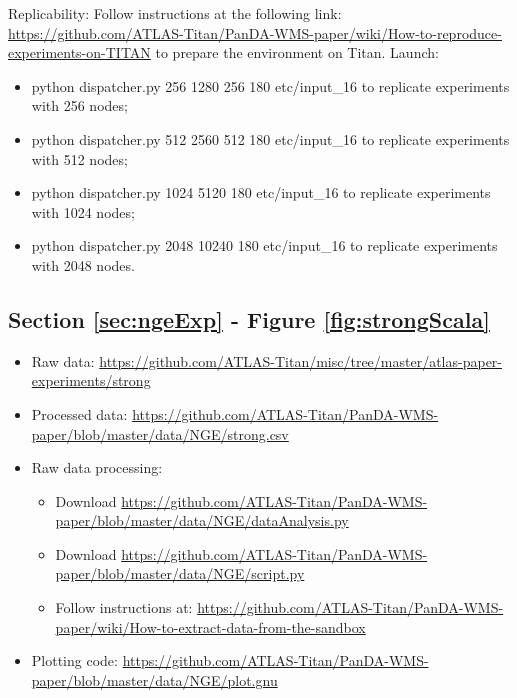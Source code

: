 Replicability: Follow instructions at the following link: \url{https://github.com/ATLAS-Titan/PanDA-WMS-paper/wiki/How-to-reproduce-experiments-on-TITAN} to prepare the environment on Titan.
Launch:
\begin{itemize}
\item python dispatcher.py 256 1280 256 180 etc/input\_16 to replicate experiments with 256 nodes;
\item python dispatcher.py 512 2560 512 180 etc/input\_16 to replicate experiments with 512 nodes;
\item python dispatcher.py 1024 5120 180 etc/input\_16 to replicate experiments with 1024 nodes;
\item python dispatcher.py 2048 10240 180 etc/input\_16 to replicate experiments with 2048 nodes.
\end{itemize}


\subsection{Section \ref{sec:ngeExp} - Figure \ref{fig:strongScala}}
\label{apndx:fig16}

\label{apndx:fig10}
\begin{itemize}
    \item Raw data: \url{https://github.com/ATLAS-Titan/misc/tree/master/atlas-paper-experiments/strong}
     \item Processed data: \url{ https://github.com/ATLAS-Titan/PanDA-WMS-paper/blob/master/data/NGE/strong.csv} 
    \item Raw data processing: 
    	\begin{itemize}
    		\item Download \url{https://github.com/ATLAS-Titan/PanDA-WMS-paper/blob/master/data/NGE/dataAnalysis.py}
    		\item Download \url{https://github.com/ATLAS-Titan/PanDA-WMS-paper/blob/master/data/NGE/script.py}
    		\item Follow instructions at: \url{https://github.com/ATLAS-Titan/PanDA-WMS-paper/wiki/How-to-extract-data-from-the-sandbox}
   	\end{itemize}
    \item Plotting code: \url{https://github.com/ATLAS-Titan/PanDA-WMS-paper/blob/master/data/NGE/plot.gnu}
\end{itemize}

